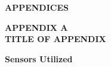 \newpage

{}

\begin{center}
    \vspace*{\fill}
    \large{\bf APPENDICES}
    \vspace*{\fill}
\end{center}

\newpage

{}
\begin{center}
    \uppercase{\large{\bf APPENDIX A\\
    TITLE OF APPENDIX}}
\end{center}


\textbf{Sensors Utilized}

